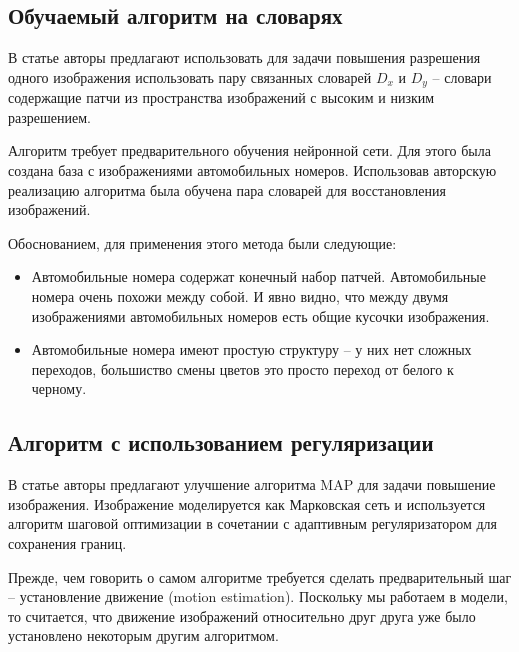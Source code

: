 \subsection{Обучаемый алгоритм на словарях}
\label{sr1}
В статье \cite{yang2012coupled} авторы предлагают использовать для задачи повышения разрешения одного изображения
использовать пару связанных словарей $D_x$ и $D_y$ -- словари содержащие патчи из пространства изображений
с высоким и низким разрешением.

Алгоритм требует предварительного обучения нейронной сети. Для этого была создана база с изображениями автомобильных
номеров. Использовав авторскую реализацию алгоритма была обучена пара словарей для восстановления изображений.

Обоснованием, для применения этого метода были следующие:
\begin{itemize}
  \item Автомобильные номера содержат конечный набор патчей. Автомобильные номера очень похожи между собой. И явно
    видно, что между двумя изображениями автомобильных номеров есть общие кусочки изображения.
  \item Автомобильные номера имеют простую структуру -- у них нет сложных переходов, большиство смены цветов это просто
    переход от белого к черному.
\end{itemize}

\subsection{Алгоритм с использованием регуляризации}
\label{sr2}
В статье \cite{yuan2008fast} авторы предлагают улучшение алгоритма MAP для задачи повышение изображения. Изображение
моделируется как Марковская сеть и используется алгоритм шаговой оптимизации в сочетании с адаптивным
регуляризатором для сохранения границ.

Прежде, чем говорить о самом алгоритме требуется сделать предварительный шаг -- установление движение (motion
estimation). Поскольку мы работаем в модели, то считается, что движение изображений относительно друг друга уже было
установлено некоторым другим алгоритмом.

